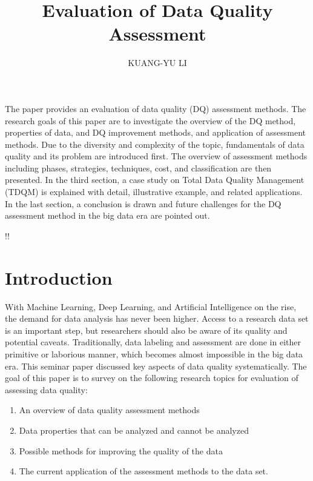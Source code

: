 \documentclass[pdftex,english,oribibl]{llncs}
\title{Evaluation of Data Quality Assessment}
\author{KUANG-YU LI}
\institute{University of Stuttgart\\Master Student in Information Technology \\70569 Stuttgart, Germany}
\makeatletter
\gdef\@keywords{}
\renewenvironment{abstract}{%
  \list{}{\advance\topsep by0.35cm\relax\small%
          \leftmargin=1cm%
          \labelwidth=\z@%
          \listparindent=\z@%
          \itemindent\listparindent%
          \rightmargin\leftmargin}%
          \item[\hskip\labelsep\bfseries\abstractname]}{%
  \if!\@keywords!\else{\item[~]\item[\hskip\labelsep\bfseries\keywordname]\@keywords}\fi%
  \endlist}
\makeatother
\begin{document}
\maketitle

\begin{abstract}
The paper provides an evaluation of data quality (DQ) assessment methods. The research goals of this paper are to investigate the overview of the DQ method, properties of data, and DQ improvement methods, and application of assessment methods. Due to the diversity and complexity of the topic, fundamentals of data quality and its problem are introduced first. The overview of assessment methods including phases, strategies, techniques, cost, and classification are then presented. In the third section, a case study on Total Data Quality Management (TDQM) is explained with detail, illustrative example, and related applications. In the last section, a conclusion is drawn and future challenges for the DQ assessment method in the big data era are pointed out.

\end{abstract}
\section{Introduction}
With Machine Learning, Deep Learning, and Artificial Intelligence on the rise, the demand for data analysis has never been higher.
Access to a research data set is an important step, but researchers should also be aware of its quality and potential caveats. Traditionally, data labeling and assessment are done in either primitive or laborious manner, which becomes almost impossible in the big data era.
This seminar paper discussed key aspects of data quality systematically.
The goal of this paper is to survey on the following research topics for evaluation of assessing data quality:
\begin{enumerate}
    \item An overview of data quality assessment methods
    \item Data properties that can be analyzed and cannot be analyzed
    \item Possible methods for improving the quality of the data
    \item The current application of the assessment methods to the data set.
\end{enumerate}
\end{document}
